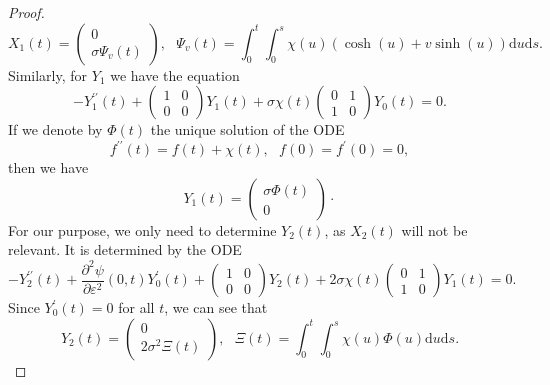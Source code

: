 \documentclass[10pt,a4paper]{amsart}
\begin{document}
\begin{proof}
    \begin{equation*}
        X_1(t) = \begin{pmatrix}
            0 \\ \sigma \Psi_v(t)
        \end{pmatrix}, ~~~ \Psi_v(t) = \int_0^t \int_0^s \chi(u)(\cosh(u) + v \sinh(u)) \mathrm{d}u\mathrm{d}s .
    \end{equation*}
    Similarly, for $Y_1$ we have the equation 
    \begin{equation*}
        - Y_1^{\prime\prime}(t) + \begin{pmatrix} 1 & 0 \\ 0 & 0\end{pmatrix}Y_1(t) + \sigma \chi(t) \begin{pmatrix} 0 & 1 \\ 1 & 0\end{pmatrix} Y_0(t) = 0 .
    \end{equation*}
    If we denote by $\Phi(t)$ the unique solution of the ODE
    \begin{equation*}
        f^{\prime\prime}(t) = f(t) + \chi(t), ~~~ f(0) = f^\prime(0) = 0,
    \end{equation*}
    then we have
    \begin{equation*}
        Y_1(t) = \begin{pmatrix}
            \sigma \Phi(t) \\ 0
        \end{pmatrix} \cdot
    \end{equation*}
    For our purpose, we only need to determine $Y_2(t)$, as $X_2(t)$ will not be relevant. It is determined by the ODE
    \begin{equation*}
        -Y_2^{\prime\prime}(t) + \frac{\partial^2\psi}{\partial\varepsilon^2}(0,t) Y_0^\prime(t) + \begin{pmatrix} 1 & 0 \\ 0 & 0 \end{pmatrix} Y_2(t) + 2 \sigma \chi(t) \begin{pmatrix} 0 & 1 \\ 1 & 0 \end{pmatrix} Y_1(t) = 0 .
    \end{equation*}
    Since $Y_0^\prime(t) = 0$ for all $t$, we can see that
    \begin{equation*}
        Y_2(t) = \begin{pmatrix}
            0 \\
            2 \sigma^2 \Xi(t)
        \end{pmatrix}, ~~~ \Xi(t) = \int_0^t \int_0^s \chi(u)\Phi(u)  \mathrm{d}u\mathrm{d}s .
    \end{equation*}


\end{proof}
\end{document}
